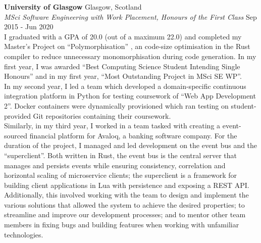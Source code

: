 \documentclass[a4paper]{article}
\begin{document}
\textbf{University of Glasgow} \hfill {\color{gray} Glasgow, Scotland} \\
\textit{MSci Software Engineering with Work Placement, Honours of the First Class} \hfill {\color{gray} Sep 2015 - Jun 2020} \\
\vspace{2mm}
I graduated with a GPA of 20.0 (out of a maximum 22.0) and completed my Master's Project on
``Polymorphisation'' \footnotemark[1], an code-size optimisation in the Rust compiler to reduce
unnecessary monomorphisation during code generation. In my first year, I was awarded ``Best
Computing Science Student Intending Single Honours'' and in my first year, ``Most Outstanding
Project in MSci SE WP''. \\
\vspace{2mm}
In my second year, I led a team which developed a domain-specific continuous integration platform
in Python for testing coursework of ``Web App Development 2''. Docker containers were dynamically
provisioned which ran testing on student-provided Git repositories containing their coursework. \\
\vspace{2mm}
Similarly, in my third year, I worked in a team tasked with creating a event-sourced financial
platform \footnotemark[2] \footnotemark[3] for Avaloq, a banking software company. For the duration
of the project, I managed and led development on the event bus and the ``superclient''. Both written
in Rust, the event bus is the central server that manages and persists events while ensuring
consistency, correlation and horizontal scaling of microservice clients; the superclient is a
framework for building client applications in Lua with persistence and exposing a REST API. \\
\vspace{2mm}
Additionally, this involved working with the team to design and implement the various solutions that
allowed the system to achieve the desired properties; to streamline and improve our development
processes; and to mentor other team members in fixing bugs and building features when working with
unfamiliar technologies.
\vspace{2mm}
\end{document}
